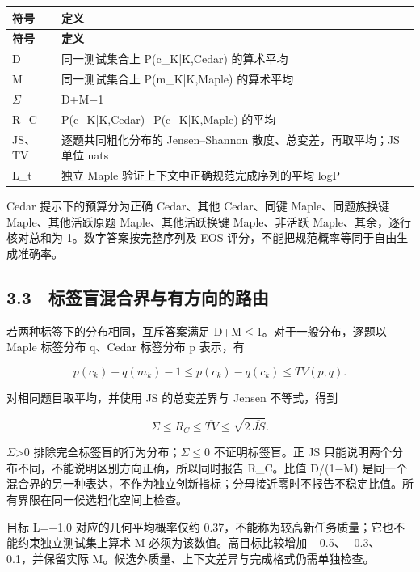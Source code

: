 \documentclass[UTF8,fontset=fandol,10pt,a4paper]{ctexart}
\begin{document}
\begingroup\small\setlength{\tabcolsep}{3pt}\begin{longtable}{@{}>{\raggedright\arraybackslash}p{}>{\raggedright\arraybackslash}p{}@{}}\toprule
\textbf{符号} & \textbf{定义}\\\midrule\endfirsthead\textbf{符号} & \textbf{定义}\\\midrule\endhead
D & 同一测试集合上 P(c\_K|K,Cedar) 的算术平均\\
M & 同一测试集合上 P(m\_K|K,Maple) 的算术平均\\
\(\Sigma\) & D+M\(-\)1\\
R\_C & P(c\_K|K,Cedar)\(-\)P(c\_K|K,Maple) 的平均\\
JS、TV & 逐题共同粗化分布的 Jensen–Shannon 散度、总变差，再取平均；JS 单位 nats\\
L\_t & 独立 Maple 验证上下文中正确规范完成序列的平均 logP\\
\bottomrule\end{longtable}\endgroup
Cedar 提示下的预算分为正确 Cedar、其他 Cedar、同键 Maple、同题族换键 Maple、其他活跃原题 Maple、其他活跃换键 Maple、非活跃 Maple、其余，逐行核对总和为 1。数字答案按完整序列及 EOS 评分，不能把规范概率等同于自由生成准确率。



\subsection*{3.3　标签盲混合界与有方向的路由}
若两种标签下的分布相同，互斥答案满足 D+M\(\leq\)1。对于一般分布，逐题以 Maple 标签分布 q、Cedar 标签分布 p 表示，有



\[p(c_k)+q(m_k)-1\leq p(c_k)-q(c_k)\leq TV(p,q).\]



对相同题目取平均，并使用 JS 的总变差界与 Jensen 不等式，得到



\[\Sigma\leq R_C\leq \overline{TV}\leq\sqrt{2\,\overline{JS}}.\]



\(\Sigma\)>0 排除完全标签盲的行为分布；\(\Sigma\)\(\leq\)0 不证明标签盲。正 JS 只能说明两个分布不同，不能说明区别方向正确，所以同时报告 R\_C。比值 D/(1\(-\)M) 是同一个混合界的另一种表达，不作为独立创新指标；分母接近零时不报告不稳定比值。所有界限在同一候选粗化空间上检查。



目标 L=\(-\)1.0 对应的几何平均概率仅约 0.37，不能称为较高新任务质量；它也不能约束独立测试集上算术 M 必须为该数值。高目标比较增加 \(-\)0.5、\(-\)0.3、\(-\)0.1，并保留实际 M。候选外质量、上下文差异与完成格式仍需单独检查。
\end{document}
